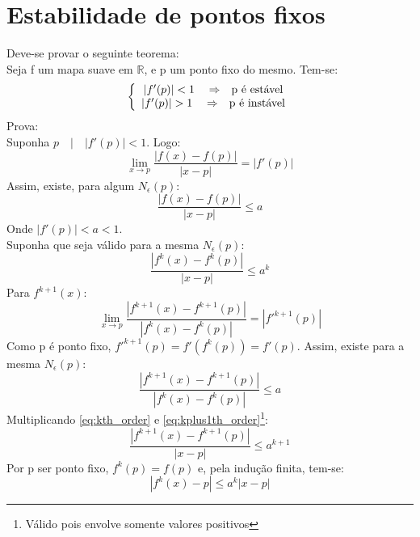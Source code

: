 \documentclass{article}[twocolumn]
\begin{document}
	\section{Estabilidade de pontos fixos}
	Deve-se provar o seguinte teorema:\\
	Seja f um mapa suave em $\mathbb{R}$, e p um ponto fixo do mesmo. Tem-se:
	\begin{equation}
		\left\{\begin{array}{c}
			|f'(p)| < 1 \quad \Rightarrow \quad $p é estável$\\
			|f'(p)| > 1 \quad \Rightarrow \quad $p é instável$
		\end{array}\right.
	\end{equation}
	Prova:\\
	Suponha $p \quad | \quad |f'(p)| < 1$. Logo:
	\begin{equation}
		\lim_{x \rightarrow p} \frac{|f(x) - f(p)|}{|x - p|} = |f'(p)|
	\end{equation}
	Assim, existe, para algum $N_{\epsilon}(p)$:
	\begin{equation}
		\frac{|f(x) - f(p)|}{|x - p|} \leqslant a
	\end{equation}
	Onde $|f'(p)| < a < 1$.\\
	Suponha que seja válido para a mesma $N_{\epsilon}(p)$:
	\begin{equation}
		\label{eq:kth_order}
		\frac{|f^{k}(x) - f^{k}(p)|}{|x - p|} \leqslant a^{k}
	\end{equation}
	Para $f^{k + 1}(x)$:
	\begin{equation}
		\lim_{x \rightarrow p} \frac{|f^{k + 1}(x) - f^{k + 1}(p)|}{|f^{k}(x) - f^{k}(p)|} =
		|f'^{k + 1}(p)|
	\end{equation}
	Como p é ponto fixo, $f'^{k + 1}(p) = f'(f^{k}(p)) = f'(p)$. Assim, existe para a mesma
	$N_{\epsilon}(p)$:
	\begin{equation}
		\label{eq:kplus1th_order}
		\frac{|f^{k + 1}(x) - f^{k + 1}(p)|}{|f^{k}(x) - f^{k}(p)|} \leqslant a
	\end{equation}
	Multiplicando \ref{eq:kth_order} e \ref{eq:kplus1th_order}\footnote{Válido pois envolve
	somente valores positivos}:
	\begin{equation}
		\frac{|f^{k + 1}(x) - f^{k + 1}(p)|}{|x - p|} \leqslant a^{k + 1}
	\end{equation}
	Por p ser ponto fixo, $f^{k}(p) = f(p)$ e, pela indução finita, tem-se:
	\begin{equation}
		|f^{k}(x) - p| \leqslant a^{k}|x - p|
	\end{equation}
\end{document}
